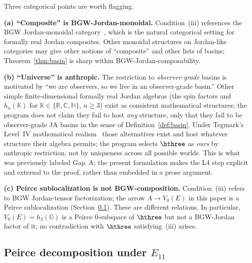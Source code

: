 \begin{remark}
\label{rem:basin-scope}
Three categorical points are worth flagging.

\textbf{(a) ``Composite'' is BGW-Jordan-monoidal.}  Condition~(iii)
references the BGW Jordan-monoidal category~\cite{BGW2020}, which is
the natural categorical setting for formally real Jordan composites.
Other monoidal structures on Jordan-like categories may give other
notions of ``composite'' and other lists of basins;
Theorem~\ref{thm:basin} is sharp within BGW-Jordan-composability.

\textbf{(b) ``Universe'' is anthropic.}  The restriction to
\emph{observer-grade} basins is motivated by ``we are observers, so
we live in an observer-grade basin.''  Other simple finite-dimensional
formally real Jordan algebras (the spin factors and $h_n(\mathbb{K})$
for $\mathbb{K}\in\{\mathbb{R},\mathbb{C},\mathbb{H}\}$, $n\geq 3$)
exist as consistent mathematical structures; the program does not
claim they fail to host \emph{any} structure, only that they fail to
be observer-grade JA basins in the sense of
Definition~\ref{def:basin}.  Under Tegmark's Level~IV mathematical
realism~\cite{Tegmark2008} those alternatives exist and host whatever
structure their algebra permits; the program selects $\hthree$ as
\emph{ours} by anthropic restriction, not by uniqueness across all
possible worlds.  This is what was previously labeled Gap~A; the
present formulation makes the L4 step explicit and external to the
proof, rather than embedded in a prose argument.

\textbf{(c) Peirce sublocalization is not BGW-composition.}
Condition~(iii) refers to BGW Jordan-tensor factorization; the
arrow $A\to V_0(E)$ in this paper is a Peirce sublocalization
(Section~\ref{sec:peirce}).  These are different relations.  In
particular, $V_0(E) = h_2(\mathbb{O})$ is a Peirce 0-subspace of
$\hthree$ but not a BGW-Jordan factor of it; no contradiction with
$\hthree$ satisfying~(iii) arises.
\end{remark}

\subsection{Peirce decomposition under \texorpdfstring{$E_{11}$}{E11}}\label{sec:peirce}

